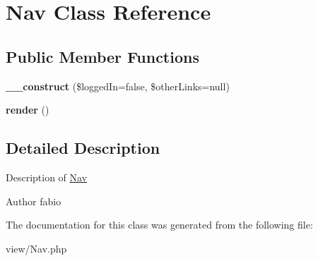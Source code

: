 \hypertarget{classNav}{\section{Nav Class Reference}
\label{classNav}
}
\subsection*{Public Member Functions}
\begin{DoxyCompactItemize}
\item 
\hypertarget{classNav_a3beabf6764c2841626291bc014c27c3e}{{\bfseries \+\_\+\+\_\+construct} (\$logged\+In=false, \$other\+Links=null)}\label{classNav_a3beabf6764c2841626291bc014c27c3e}

\item 
\hypertarget{classNav_a3e7c5d2f40a243aa27bcef340cf2ec9d}{{\bfseries render} ()}\label{classNav_a3e7c5d2f40a243aa27bcef340cf2ec9d}

\end{DoxyCompactItemize}


\subsection{Detailed Description}
Description of \hyperlink{classNav}{Nav}

\begin{DoxyAuthor}{Author}
fabio 
\end{DoxyAuthor}


The documentation for this class was generated from the following file\+:\begin{DoxyCompactItemize}
\item 
view/Nav.\+php\end{DoxyCompactItemize}
